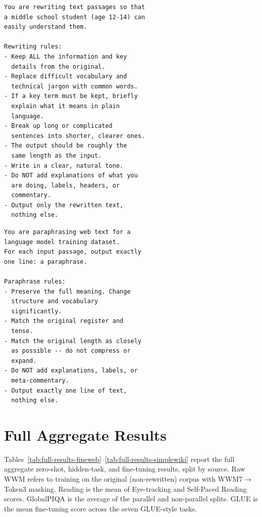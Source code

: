 \documentclass[11pt]{article}
\begin{document}
\begin{center}
\scriptsize
\renewcommand{\baselinestretch}{0.78}\selectfont
\begin{verbatim}
You are rewriting text passages so that
a middle school student (age 12-14) can
easily understand them.

Rewriting rules:
- Keep ALL the information and key
  details from the original.
- Replace difficult vocabulary and
  technical jargon with common words.
- If a key term must be kept, briefly
  explain what it means in plain
  language.
- Break up long or complicated
  sentences into shorter, clearer ones.
- The output should be roughly the
  same length as the input.
- Write in a clear, natural tone.
- Do NOT add explanations of what you
  are doing, labels, headers, or
  commentary.
- Output only the rewritten text,
  nothing else.
\end{verbatim}
\label{fig:expl-prompt}
\end{center}

\begin{center}
\scriptsize
\renewcommand{\baselinestretch}{0.78}\selectfont
\begin{verbatim}
You are paraphrasing web text for a
language model training dataset.
For each input passage, output exactly
one line: a paraphrase.

Paraphrase rules:
- Preserve the full meaning. Change
  structure and vocabulary
  significantly.
- Match the original register and
  tense.
- Match the original length as closely
  as possible -- do not compress or
  expand.
- Do NOT add explanations, labels, or
  meta-commentary.
- Output exactly one line of text,
  nothing else.
\end{verbatim}
\label{fig:para-prompt}
\end{center}

\section{Full Aggregate Results}
\label{app:full-aggregate-results}

Tables~\ref{tab:full-results-fineweb}--\ref{tab:full-results-simplewiki} report the full aggregate zero-shot, hidden-task, and fine-tuning results, split by source. Raw WWM refers to training on the original (non-rewritten) corpus with WWM7$\to$Token3 masking. Reading is the mean of Eye-tracking and Self-Paced Reading scores. GlobalPIQA is the average of the parallel and non-parallel splits. GLUE is the mean fine-tuning score across the seven GLUE-style tasks.
\end{document}

